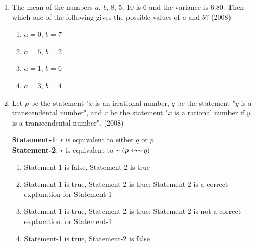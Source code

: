 \documentclass[journal]{IEEEtran}
\begin{document}
\begin{enumerate}
        \begin{multicols}{2}
            \begin{enumerate}
                \item 5 kg and 12 kg
                \item 5 kg and 13 kg
                \item 12 kg and 13 kg
                \item 5 kg and 5 kg
            \end{enumerate} 
        \end{multicols}

    \item The mean of the numbers $a$, $b$, 8, 5, 10 is 6 and
        the variance is $6.80$. Then which one of the following
        gives the possible values of $a$ and $b$?
        \hfill (2008)

        \begin{multicols}{2}
            \begin{enumerate}
                \item $a = 0$, $b = 7$
                \item $a = 5$, $b = 2$
                \item $a = 1$, $b = 6$
                \item $a = 3$, $b = 4$
            \end{enumerate}
        \end{multicols}

    \item Let $p$ be the statement "$x$ is an irrational number,
        $q$ be the statement "$y$ is a transcendental number",
        and $r$ be the statement "$x$ is a rational number if
        $y$ is a transcendental number".
        \hfill (2008)

        \textbf{Statement-1}: $r$ is equivalent to either $q$ or $p$ \\
        \textbf{Statement-2}: $r$ is equivalent to $\sim \left(p \leftrightarrow \sim q\right)$

        \begin{enumerate}
            \item Statement-1 is false, Statement-2 is true
            \item Statement-1 is true, Statement-2 is true;
                Statement-2 is a correct explanation for Statement-1
            \item Statement-1 is true, Statement-2 is true;
                Statement-2 is not a correct explanation for Statement-1
            \item Statement-1 is true, Statement-2 is false
        \end{enumerate}


\end{enumerate}
\end{document}

